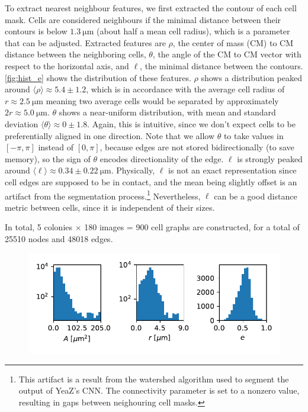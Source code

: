 \documentclass[10pt,conference,compsocconf,a4paper]{IEEEtran}
\newcommand{\nunit}[1]{\ \si{#1}}  %
\newcommand{\avg}[1]{\langle{#1}\rangle}
\newcommand*{\shortautoref}[1]{%
	\begingroup
	\def\equationautorefname{\textsc{Eq.}}%
	\def\tableautorefname{\textsc{Tab.}}%
	\def\figureautorefname{\textsc{Fig.}}%
	\autoref{#1}%
	\endgroup
}
\begin{document}
		To extract nearest neighbour features, we first extracted the contour of each cell mask. Cells are considered neighbours if the minimal distance between their contours is below $1.3 \nunit{\micro \meter}$ (about half a mean cell radius), which is a parameter that can be adjusted.
		Extracted features are $\rho$, the center of mass (CM) to CM distance between the neighboring cells, $\theta$, the angle of the CM to CM vector with respect to the horizontal axis, and $\ell$, the minimal distance between the contours. \shortautoref{fig:hist_e} shows the distribution of these features. $\rho$ shows a distribution peaked around $\avg{\rho} \approx 5.4 \pm 1.2$, which is in accordance with the average cell radius of $r \approx 2.5 \nunit{\micro \meter}$ meaning two average cells would be separated by approximately $2r \approx 5.0 \nunit{\micro \meter}$. $\theta$ shows a near-uniform distribution, with mean and standard deviation $\avg{\theta} \approx 0 \pm 1.8$. Again, this is intuitive, since we don't expect cells to be preferentially aligned in one direction. Note that we allow $\theta$ to take values in $[-\pi, \pi]$ instead of $[0, \pi]$, because edges are not stored bidirectionally (to save memory), so the sign of $\theta$ encodes directionality of the edge. $\ell$ is strongly peaked around $\avg{\ell} \approx 0.34 \pm 0.22 \nunit{\micro \meter}$. Physically, $\ell$ is not an exact representation since cell edges are supposed to be in contact, and the mean being slightly offset is an artifact from the segmentation process.\footnote{This artifact is a result from the watershed algorithm used to segment the output of YeaZ's CNN. The connectivity parameter is set to a nonzero value, resulting in gaps between neighouring cell masks.} Nevertheless, $\ell$ can be a good distance metric between cells, since it is independent of their sizes.

		In total, 5 colonies $\times$ 180 images = 900 cell graphs are constructed, for a total of 25510 nodes and 48018 edges.

		\begin{figure}
			\centering
			\includegraphics[width=\linewidth]{figures/hist_x.pdf}
			\label{fig:hist_x}
		\end{figure}
	
\end{document}
